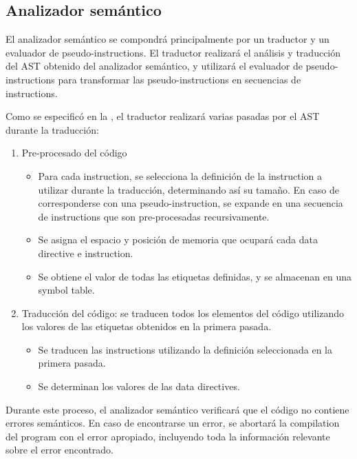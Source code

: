\subsection{Analizador semántico}

El analizador semántico se compondrá principalmente por un traductor y un
evaluador de \glspl{pseudo-instruction}. El traductor realizará el análisis y
traducción del \gls{AST} obtenido del analizador semántico, y utilizará el
evaluador de \glspl{pseudo-instruction} para transformar las
\glspl{pseudo-instruction} en secuencias de \glspl{instruction}.

Como se especificó en la , el traductor realizará varias
pasadas por el \gls{AST} durante la traducción:

\begin{enumerate}
    \item Pre-procesado del código
    \begin{itemize}
        \item Para cada \gls{instruction}, se selecciona la definición de la
        \gls{instruction} a utilizar durante la traducción, determinando así su
        tamaño. En caso de corresponderse con una \gls{pseudo-instruction}, se
        expande en una secuencia de \glspl{instruction} que son pre-procesadas
        recursivamente.
        \item Se asigna el espacio y posición de memoria que ocupará cada
        \gls{data directive} e \gls{instruction}.
        \item Se obtiene el valor de todas las etiquetas definidas,
        y se almacenan en una \gls{symbol table}.
    \end{itemize}
    \item Traducción del código: se traducen todos los elementos del código
    utilizando los valores de las etiquetas obtenidos en la primera pasada.
    \begin{itemize}
        \item Se traducen las \glspl{instruction} utilizando la definición
        seleccionada en la primera pasada.
        \item Se determinan los valores de las \glspl{data directive}.
    \end{itemize}
\end{enumerate}

Durante este proceso, el analizador semántico verificará que el código no
contiene errores semánticos. En caso de encontrarse un error, se abortará la
\gls{compilation} del \gls{program} con el error apropiado, incluyendo toda la
información relevante sobre el error encontrado.
